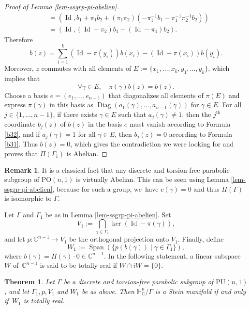 \documentclass[JEP,XML,SOM,Unicode,NoEqCountersInSection,published]{cedram}
\newtheorem{theorem}{Theorem}[section]
\theoremstyle{definition}
\newtheorem*{remark}{Remark}
\newcommand{\C}{\mathbb{C}}
\newcommand{\HNC}{\mathbb{H}^{n}_{\C}}
\newcommand{\PU}{\mathrm{PU}}
\newcommand{\PO}{\mathrm{PO}}
\DeclareMathOperator{\Id}{Id}
\DeclareMathOperator{\Diag}{Diag}
\def\C{\mathbb{C}}
\newcommand{\HNC}{\mathbb{H}^{n}_{\C}}
\newcommand{\PU}{\mathrm{PU}}
\begin{document}
\begin{proof}[Proof of Lemma \ref{lem-ssgrp-pi-abelien}]
\begin{align*}
&= (\Id,b_1+\pi_1b_2 +(\pi_1\pi_2)(-\pi_1^{-1}b_1 - \pi_1^{-1}\pi_2^{-1}b_2))\\
&= (\Id,(\Id-\pi_2)b_1-(\Id-\pi_1)b_2).
\end{align*}
Therefore
\begin{equation}\label{b31}
b(z)=\sum_{i=1}^{k}(\Id-\pi(y_i))b(x_i)-(\Id-\pi(x_i))b(y_i).
\end{equation}
Moreover, $z$ commutes with all elements of $E:=\{x_1,\dots,x_k,y_1,\dots,y_k\}$, which implies that
\begin{equation}\label{b32}
\forall \gamma \in E,\quad \pi(\gamma)b(z)=b(z).
\end{equation}
Choose a basis $e=(e_1,\dots,e_{n-1})$ that diagonalizes all elements of $\pi(E)$ and express $\pi(\gamma)$ in this basis as $\Diag(a_1(\gamma),\dots,a_{n-1}(\gamma))$ for $\gamma\in E$. For all $j\in\{1,\dots,n-1\}$, if there exists $\gamma\in E$ such that $a_j(\gamma)\ne 1$, then the $j^{\text{th}}$ coordinate $b_j(z)$ of $b(z)$ in the basis $e$ must vanish according to Formula \eqref{b32}, and if $a_j(\gamma)= 1$ for all $\gamma\in E$, then $b_j(z)=0$ according to Formula \eqref{b31}. Thus $b(z)=0$, which gives the contradiction we were looking for and proves that $\Pi(\Gamma_1)$ is Abelian.
\end{proof}

\begin{remark}
It is a classical fact that any discrete and torsion-free parabolic subgroup of $\PO(n,1)$ is virtually Abelian. This can be seen using Lemma \ref{lem-ssgrp-pi-abelien}, because for such a group, we~have $c(\gamma)=0$ and thus $\Pi(\Gamma)$ is isomorphic to $\Gamma$.
\end{remark}

Let $\Gamma$ and $\Gamma_1$ be as in Lemma \ref{lem-ssgrp-pi-abelien}. Set
\begin{equation*}
V_1:= \bigcap_{\gamma\in \Gamma_1}\ker(\operatorname{Id}-\pi(\gamma)),
\end{equation*} and let $p:\C^{n-1}\to V_1$ be the orthogonal projection onto $V_1$. Finally, define
\begin{equation*}
W_1:= \operatorname{Span}(\{p(b(\gamma)) \mid \gamma\in \Gamma_1\}),
\end{equation*}
where $b(\gamma)=\Pi(\gamma)\cdot 0 \in \C^{n-1}$. In the following statement, a linear subspace~$W$ of~$\C^{n-1}$ is said to be totally real if $W\cap iW=\{0\}$.

\begin{theorem}\label{thm-caracterisation-parab-stein}
Let $\Gamma$ be a discrete and torsion-free parabolic subgroup of $\PU(n,1)$, and let $\Gamma_1,p, V_1$ and $W_1$ be as above. Then $\HNC/\Gamma$ is a Stein manifold if and only if~$W_1$ is totally real.
\end{theorem}
\end{document}
